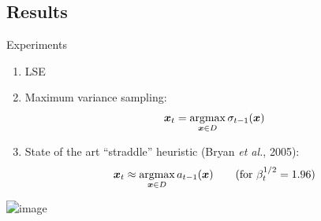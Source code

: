 \documentclass[10pt,mathserif]{beamer}
\newcommand{\acl}{\textsf{LSE}\xspace}
\begin{document}
\subsection*{Results}
\begin{frame}
\begin{center}
{\large Experiments}
\end{center}
\begin{enumerate}
\item \acl
\item<2-> Maximum variance sampling:
\vspace{-0.5em}
\begin{align*}
\*x_t = \argmax_{\*x\in D} \sigma_{t-1}(\*x)
\end{align*}
\item<3-> State of the art ``straddle'' heuristic (Bryan \emph{et al.}, 2005):
\vspace{-0.5em}
\begin{align*}
\*x_t \approx \argmax_{\*x\in D} a_{t-1}(\*x) \tag{for $\beta_t^{1/2} = 1.96$}
\end{align*}
\end{enumerate}
\end{frame}

\begin{frame}
\begin{center}
\hspace{4pt}\includegraphics<1->[width=4in]{figures/limno_chl_ls}\\[0.5em]
\end{center}
\end{frame}
\end{document}

